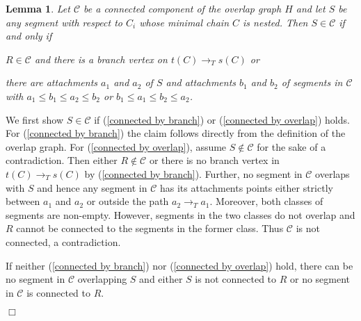 \documentclass[paper=a4]{scrartcl}
\newtheorem{lemma}{Lemma}
\newcommand{\mqed}{\hfill$\Box$}
\newlength{\proofpostskipamount}\newlength{\proofpreskipamount}
\newenvironment{proof}{\par\vspace{\proofpreskipamount}\noindent{\textbf{Proof:}}\hspace{0.5em}}{\nopagebreak \strut\nopagebreak \hspace{\fill}\mqed\par\vspace{\proofpostskipamount}\noindent}
\begin{document}
\newcommand{\calC}{{\mathcal{C}}}

\begin{lemma}\label{overlap with calC suffices}
Let $\calC$ be a connected component of the overlap graph $H$ and let $S$ be any segment with respect to $C_i$ whose minimal chain $C$ is nested. Then $S\in \calC$ if and only if
  \begin{compactenum}[(i)]
  \item \label{connected by branch} $R\in \calC$ and there is a branch vertex on $t(C)\rightarrow_T s(C)$ or
  \item \label{connected by overlap} there are attachments $a_1$ and $a_2$ of $S$ and attachments $b_1$ and $b_2$ of segments in $\calC$ with $a_1 \le b_1 \le a_2 \le b_2$ or $b_1 \le a_1 \le b_2 \le a_2$.
  \end{compactenum}
\end{lemma}
\begin{proof} We first show $S\in \calC$ if (\ref{connected by branch}) or (\ref{connected by overlap}) holds. For (\ref{connected by branch}) the claim follows directly from the definition of the overlap graph. For (\ref{connected by overlap}), assume $S \not\in \calC$ for the sake of a contradiction. Then either $R\not \in \calC$ or there is no branch vertex in $t(C)\rightarrow_T s(C)$ by (\ref{connected by branch}). Further, no segment in $\calC$ overlaps with $S$ and hence any segment in $\calC$ has its attachments points either strictly between $a_1$ and $a_2$ or outside the path $a_2 \rightarrow_T a_1$. Moreover, both classes of segments are non-empty. However, segments in the two classes do not overlap and $R$ cannot be connected to the segments in the former class. Thus $\calC$ is not connected, a contradiction.

If neither (\ref{connected by branch}) nor (\ref{connected by overlap}) hold, there can be no segment in $\calC$ overlapping $S$ and either $S$ is not connected to $R$ or no segment in $\calC$ is connected to $R$.
\end{proof}
\end{document}
